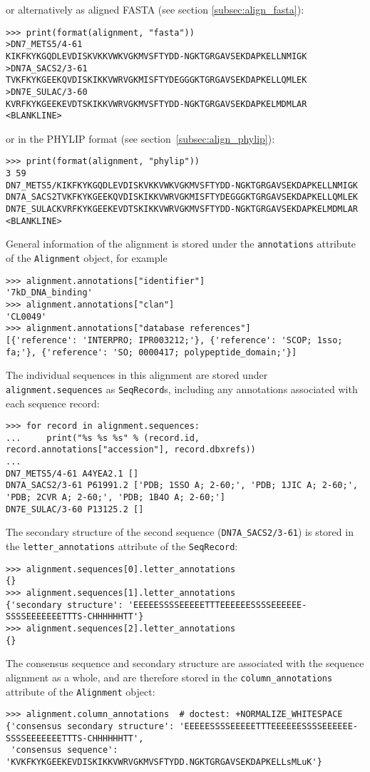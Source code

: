 or alternatively as aligned FASTA (see section \ref{subsec:align_fasta}):
\begin{verbatim}
>>> print(format(alignment, "fasta"))
>DN7_METS5/4-61
KIKFKYKGQDLEVDISKVKKVWKVGKMVSFTYDD-NGKTGRGAVSEKDAPKELLNMIGK
>DN7A_SACS2/3-61
TVKFKYKGEEKQVDISKIKKVWRVGKMISFTYDEGGGKTGRGAVSEKDAPKELLQMLEK
>DN7E_SULAC/3-60
KVRFKYKGEEKEVDTSKIKKVWRVGKMVSFTYDD-NGKTGRGAVSEKDAPKELMDMLAR
<BLANKLINE>
\end{verbatim}
or in the PHYLIP format (see section~\ref{subsec:align_phylip}):
\begin{verbatim}
>>> print(format(alignment, "phylip"))
3 59
DN7_METS5/KIKFKYKGQDLEVDISKVKKVWKVGKMVSFTYDD-NGKTGRGAVSEKDAPKELLNMIGK
DN7A_SACS2TVKFKYKGEEKQVDISKIKKVWRVGKMISFTYDEGGGKTGRGAVSEKDAPKELLQMLEK
DN7E_SULACKVRFKYKGEEKEVDTSKIKKVWRVGKMVSFTYDD-NGKTGRGAVSEKDAPKELMDMLAR
<BLANKLINE>
\end{verbatim}
General information of the alignment is stored under the \verb+annotations+ attribute of the \verb+Alignment+ object, for example
\begin{verbatim}
>>> alignment.annotations["identifier"]
'7kD_DNA_binding'
>>> alignment.annotations["clan"]
'CL0049'
>>> alignment.annotations["database references"]
[{'reference': 'INTERPRO; IPR003212;'}, {'reference': 'SCOP; 1sso; fa;'}, {'reference': 'SO; 0000417; polypeptide_domain;'}]
\end{verbatim}
The individual sequences in this alignment are stored under \verb|alignment.sequences| as \verb|SeqRecord|s, including any annotations associated with each sequence record:
\begin{verbatim}
>>> for record in alignment.sequences:
...     print("%s %s %s" % (record.id, record.annotations["accession"], record.dbxrefs))
...
DN7_METS5/4-61 A4YEA2.1 []
DN7A_SACS2/3-61 P61991.2 ['PDB; 1SSO A; 2-60;', 'PDB; 1JIC A; 2-60;', 'PDB; 2CVR A; 2-60;', 'PDB; 1B4O A; 2-60;']
DN7E_SULAC/3-60 P13125.2 []
\end{verbatim}
The secondary structure of the second sequence (\verb+DN7A_SACS2/3-61+) is stored in the \verb+letter_annotations+ attribute of the \verb+SeqRecord+:
\begin{verbatim}
>>> alignment.sequences[0].letter_annotations
{}
>>> alignment.sequences[1].letter_annotations
{'secondary structure': 'EEEEESSSSEEEEETTTEEEEEESSSSEEEEEE-SSSSEEEEEEETTTS-CHHHHHHTT'}
>>> alignment.sequences[2].letter_annotations
{}
\end{verbatim}
The consensus sequence and secondary structure are associated with the sequence alignment as a whole, and are therefore stored in the \verb+column_annotations+ attribute of the \verb+Alignment+ object:
\begin{verbatim}
>>> alignment.column_annotations  # doctest: +NORMALIZE_WHITESPACE
{'consensus secondary structure': 'EEEEESSSSEEEEETTTEEEEEESSSSEEEEEE-SSSSEEEEEEETTTS-CHHHHHHTT',
 'consensus sequence': 'KVKFKYKGEEKEVDISKIKKVWRVGKMVSFTYDD.NGKTGRGAVSEKDAPKELLsMLuK'}
\end{verbatim}


